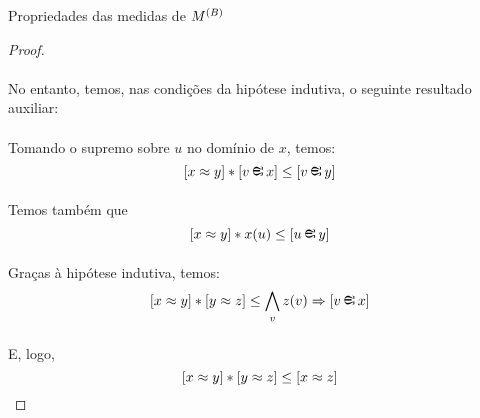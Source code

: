 \begin{proposition}{Propriedades das medidas de $\M{B}$}
\begin{proof}
            \paragraph{}
                No entanto, temos, nas condições da hipótese indutiva, o seguinte resultado auxiliar:
            \begin{prooftree}
            \end{prooftree}
            \paragraph{}
                Tomando o supremo sobre $u$ no domínio de $x$, temos:
            $$[x \Meq y]*[v\Min x]\leq[v\Min y]$$
            \paragraph{}
                Temos também que
            $$[x \Meq y] * x(u) \leq [u\Min y]$$
            \begin{prooftree}
            \end{prooftree}

            \paragraph{}
                Graças à hipótese indutiva, temos:
            $$[x \Meq y]*[y \Meq z] \leq\bigwedge_v z(v)\RAR[v\Min x] $$
            \paragraph{}
                E, logo, 
            $$[x \Meq y]*[y \Meq z]\leq [x \Meq z]$$\eop
        \end{proof}
    \end{proposition}